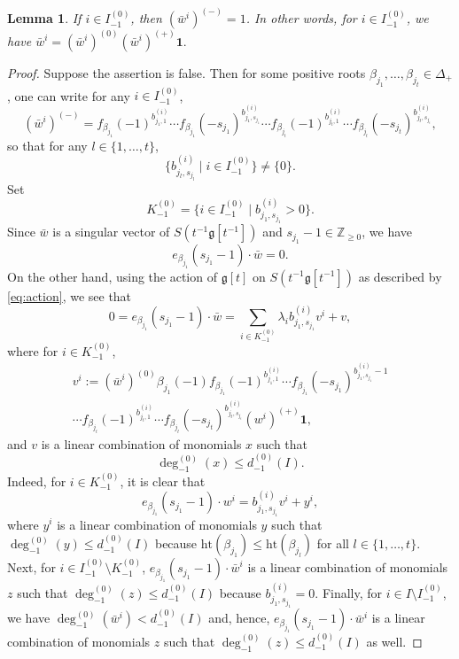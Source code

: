 \documentclass[JEP,XML,SOM,Unicode]{cedram}
\let\be\beta
\newcommand\Z{{\mathbb Z}}
\newcommand \g{\mathfrak g}
\newtheorem{lem}[theorem]{Lemma}
\theoremstyle{definition}
\begin{document}
\begin{lem}
\label{lem:wi_-}
If $i\in I_{-1}^{(0)}$, then $(\bar w^i)^{(-)}=1$. In
other words, for $i \in I_{-1}^{(0)}$, we have
$\bar w^{i}= (\bar w^{i})^{(0)} (\bar w^{i})^{(+)} \mathbf{1}.$
\end{lem}
\begin{proof} Suppose the assertion is false.
Then for some positive roots $\beta_{j_1},\dots,\beta_{j_t} \in \Delta_+$,
one can write for any $i \in I_{-1}^{(0)}$,
\begin{equation}\label{e5}
(\bar w^i)^{(-)}=f_{\be_{j_1}}(-1)^{b_{j_1,1}^{(i)}}
\cdots f_{\be_{j_1}}(-s_{j_1})^{b_{j_1,s_{j_1}}^{(i)}}\cdots
f_{\be_{j_t}}(-1)^{b_{j_t,1}^{(i)}}
\cdots f_{\be_{j_t}}(-s_{j_t})^{b_{j_t,s_{j_t}}^{(i)}},
\end{equation}
so that for any $l \in \{1,\dots,t\}$,
\[
\{b_{j_l,s_{j_l}}^{(i)} \mid i \in I_{-1}^{(0)}\}\neq \{0\}.
\]
Set
\[
K_{-1}^{(0)} = \{i \in I_{-1}^{(0)} \mid b_{j_1,s_{j_1}}^{(i)}> 0 \}.
\]
Since $\bar w$ is a singular vector of $S(t^{-1}\g[t^{-1}])$ and $s_{j_1}-1 \in\Z_{\geq 0}$,
we have
\[
e_{\beta_{j_1}}(s_{j_1}-1)\cdot\bar w=0.
\]
On the other hand, using the action of $\g[t]$ on $S(t^{-1}\g[t^{-1}])$
as described by \eqref{eq:action}, we see that
\begin{equation}
\label{eq:wi_-}
0=e_{\beta_{j_1}}(s_{j_1}-1) \cdot\bar w =
\sum_{i \in K_{-1}^{(0)}} \lambda_ib_{j_1,s_{j_1}}^{(i)} v^{i} + v,
\end{equation}
where for $i \in K_{-1}^{(0)}$,
\begin{multline*}
v^{i}:=
(\bar w^{i})^{(0)} {\be_{j_1}(-1)}
f_{\be_{j_1}}(-1)^{b_{j_1,1}^{(i)}}
\cdots f_{\be_{j_1}}(-s_{j_1})^{b_{j_1,s_{j_1}}^{(i)}-1}\\
\cdots
f_{\be_{j_t}}(-1)^{b_{j_t,1}^{(i)}}
\cdots f_{\be_{j_t}}(-s_{j_t})^{b_{j_t,s_{j_t}}^{(i)}} (w^{i})^{(+)} \mathbf{1},
\end{multline*}
and $v$ is a linear combination of monomials $x$
such that
\[
\deg_{-1}^{(0)}(x) \leq d_{-1}^{(0)}(I).
\]
Indeed, for $i \in K_{-1}^{(0)}$, it is clear that
\begin{equation*}
e_{\beta_{j_1}}(s_{j_1}-1)\cdot w^{i} = b_{j_1,s_{j_1}}^{(i)} v^{i} + y^{i},
\end{equation*}
where $y^{i}$ is a linear combination of monomials $y$
such that
$\deg_{-1}^{(0)}(y) \leq d_{-1}^{(0)}(I)$ because
$\mathrm{ht}(\beta_{j_1}) \leq \mathrm{ht}(\beta_{j_l})$
for all $l \in \{1,\dots,t\}$.
Next, for $i \in I_{-1}^{(0)} \setminus K_{-1}^{(0)}$,
$e_{\beta_{j_1}} (s_{j_1}-1)\cdot\bar w^{i} $ is a
linear combination of monomials $z$ such that
$\deg_{-1}^{(0)}(z) \leq d_{-1}^{(0)}(I)$ because
$b_{j_1,s_{j_1}}^{(i)}=0$.
Finally, for $i \in I \setminus I_{-1}^{(0)}$, we have $\deg_{-1}^{(0)}(\bar w^{i}) < d_{-1}^{(0)}(I) $
and, hence, $e_{\beta_{j_1}}(s_{j_1}-1) \cdot\bar w^{i} $ is a
linear combination of monomials $z$ such that
$\deg_{-1}^{(0)}(z) \leq d_{-1}^{(0)}(I)$ as well.


\end{proof}
\end{document}
